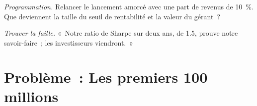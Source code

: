 \begin{exercise}[$\star\star\star$]\label{exo:fm:launching-a-fund-and-raising-capital:7}
\emph{Programmation.} Relancer le lancement amorcé avec une part de revenus de 10~\%. Que deviennent la taille du seuil de rentabilité et la valeur du gérant~?
\end{exercise}

\begin{exercise}[$\star\star\star$]\label{exo:fm:launching-a-fund-and-raising-capital:8}
\emph{Trouver la faille.} «~Notre ratio de Sharpe sur deux ans, de 1.5, prouve notre savoir-faire~; les investisseurs viendront.~»
\end{exercise}

\section{Problème~: Les premiers 100 millions}

